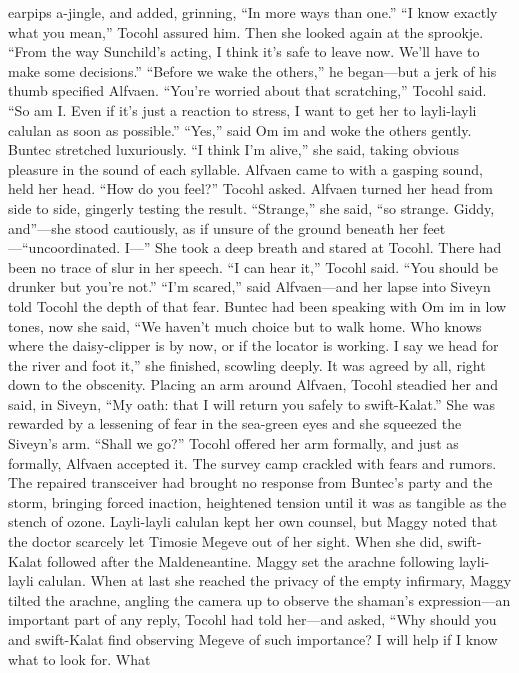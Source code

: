 \documentclass[9pt]{article}
\begin{document}
earpips a-jingle, and added, grinning, “In more ways than one.”
“I know exactly what you mean,” Tocohl assured him. Then she looked again at the sprookje. “From
the way Sunchild’s acting, I think it’s safe to leave now. We’ll have to make some decisions.”
“Before we wake the others,” he began—but a jerk of his thumb specified Alfvaen.
“You’re worried about that scratching,” Tocohl said. “So am I. Even if it’s just a reaction to stress, I
want to get her to layli-layli calulan as soon as possible.”
“Yes,” said Om im and woke the others gently. Buntec stretched luxuriously. “I think I’m alive,” she
said, taking obvious pleasure in the sound of each syllable. Alfvaen came to with a gasping sound, held
her head.
“How do you feel?” Tocohl asked.
Alfvaen turned her head from side to side, gingerly testing the result. “Strange,” she said, “so strange.
Giddy, and”—she stood cautiously, as if unsure of the ground beneath her feet—“uncoordinated. I—”
She took a deep breath and stared at Tocohl.
There had been no trace of slur in her speech.
“I can hear it,” Tocohl said. “You should be drunker but you’re not.”
“I’m scared,” said Alfvaen—and her lapse into Siveyn told Tocohl the depth of that fear.
Buntec had been speaking with Om im in low tones, now she said, “We haven’t much choice but to
walk home. Who knows where the daisy-clipper is by now, or if the locator is working. I say we head
for the river and foot it,” she finished, scowling deeply. It was agreed by all, right down to the obscenity.
Placing an arm around Alfvaen, Tocohl steadied her and said, in Siveyn, “My oath: that I will return
you safely to swift-Kalat.” She was rewarded by a lessening of fear in the sea-green eyes and she
squeezed the Siveyn’s arm. “Shall we go?” Tocohl offered her arm formally, and just as formally, Alfvaen
accepted it.
The survey camp crackled with fears and rumors. The repaired transceiver had brought no response
from Buntec’s party and the storm, bringing forced inaction, heightened tension until it was as tangible as
the stench of ozone. Layli-layli calulan kept her own counsel, but Maggy noted that the doctor scarcely
let Timosie Megeve out of her sight. When she did, swift-Kalat followed after the Maldeneantine.
Maggy set the arachne following layli-layli calulan. When at last she reached the privacy of the
empty infirmary, Maggy tilted the arachne, angling the camera up to observe the shaman’s
expression—an important part of any reply, Tocohl had told her—and asked, “Why should you and
swift-Kalat find observing Megeve of such importance? I will help if I know what to look for. What
\end{document}
